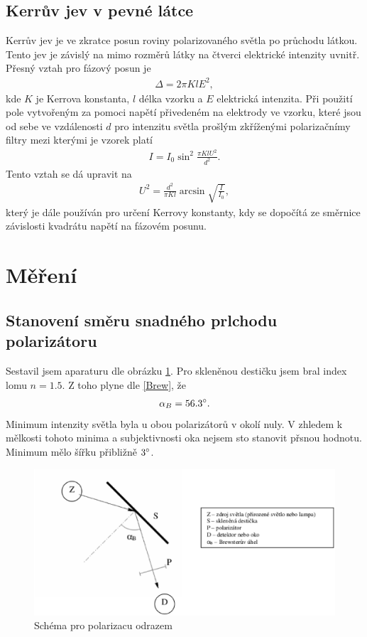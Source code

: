 \documentclass[a4paper,12pt]{article}
\begin{document}
\subsection{Kerrův jev v pevné látce}
Kerrův jev je ve zkratce posun roviny polarizovaného světla po průchodu látkou. Tento jev je závislý na mimo rozměrů látky na čtverci elektrické intenzity uvnitř. 
Přesný vztah pro fázový posun je
\begin{eqnarray}
\Delta=2\pi KlE^2,
\end{eqnarray}
kde $K$ je Kerrova konstanta, $l$ délka vzorku a $E$ elektrická intenzita.
Při použití pole vytvořeným za pomoci napětí přivedeném na elektrody ve vzorku, které jsou od sebe ve vzdálenosti $d$ pro intenzitu světla prošlým zkříženými polarizačnímy 
filtry mezi kterými je vzorek platí
\begin{eqnarray}
I=I_0\sin^2\frac{\pi KlU^2}{d^2}.
\label{I}
\end{eqnarray}
Tento vztah se dá upravit na
\begin{eqnarray}
U^2=\frac{d^2}{\pi Kl}\arcsin\sqrt{\frac{I}{I_0}},
\label{Kb}
\end{eqnarray}
který je dále používán pro určení Kerrovy konstanty, kdy se dopočítá ze směrnice závislosti kvadrátu napětí na fázovém posunu.

\section{Měření}
\subsection{Stanovení směru snadného prlchodu polarizátoru}
Sestavil jsem aparaturu dle obrázku \ref{Obr1}. Pro skleněnou destičku jsem bral index lomu $n=1.5$. Z toho plyne dle \ref{Brew}, že
\begin{eqnarray}
\alpha_B=56.3^{\circ}.
\end{eqnarray}
Minimum intenzity světla byla u obou polarizátorů v okolí nuly. V zhledem k mělkosti tohoto minima a subjektivnosti oka nejsem sto stanovit přsnou hodnotu. 
Minimum mělo šířku přibližně $3^{\circ}$.

\begin{figure}
\begin{center}
\includegraphics[width=6in]{obr1.eps}
\end{center}
\caption{Schéma pro polarizacu odrazem}
\label{Obr1}
\end{figure}
\end{document}
